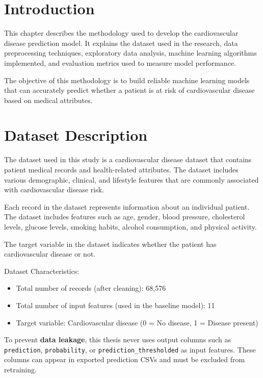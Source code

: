 \section{Introduction}

This chapter describes the methodology used to develop the cardiovascular disease prediction model. It explains the dataset used in the research, data preprocessing techniques, exploratory data analysis, machine learning algorithms implemented, and evaluation metrics used to measure model performance.

The objective of this methodology is to build reliable machine learning models that can accurately predict whether a patient is at risk of cardiovascular disease based on medical attributes.

\section{Dataset Description}

The dataset used in this study is a cardiovascular disease dataset that contains patient medical records and health-related attributes. The dataset includes various demographic, clinical, and lifestyle features that are commonly associated with cardiovascular disease risk.

Each record in the dataset represents information about an individual patient. The dataset includes features such as age, gender, blood pressure, cholesterol levels, glucose levels, smoking habits, alcohol consumption, and physical activity.

The target variable in the dataset indicates whether the patient has cardiovascular disease or not.

Dataset Characteristics:

\begin{itemize}
\item Total number of records (after cleaning): 68,576
\item Total number of input features (used in the baseline model): 11
\item Target variable: Cardiovascular disease (0 = No disease, 1 = Disease present)
\end{itemize}

\begin{keyinsight}
To prevent \textbf{data leakage}, this thesis never uses output columns such as \texttt{prediction}, \texttt{probability}, or \texttt{prediction\_thresholded} as input features. These columns can appear in exported prediction CSVs and must be excluded from retraining.
\end{keyinsight}

